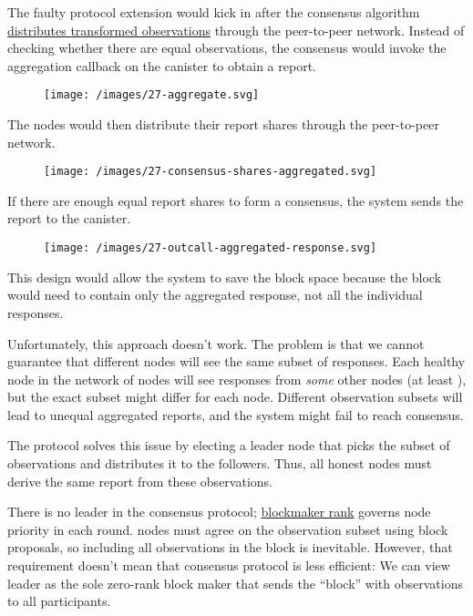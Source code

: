 \documentclass{article}
\begin{document}
The faulty protocol extension would kick in after the consensus algorithm \href{#fig-consensus-shares-transformed}{distributes transformed observations} through the peer-to-peer network.
Instead of checking whether there are  equal observations, the consensus would invoke the aggregation callback on the canister to obtain a report.

\begin{figure}[grayscale-diagram,p75]
\texttt{[image: /images/27-aggregate.svg]}
\end{figure}

The nodes would then distribute their report shares through the peer-to-peer network.

\begin{figure}[grayscale-diagram,p75]
\texttt{[image: /images/27-consensus-shares-aggregated.svg]}
\end{figure}

If there are enough equal report shares to form a consensus, the system sends the report to the canister.

\begin{figure}[grayscale-diagram,p75]
\texttt{[image: /images/27-outcall-aggregated-response.svg]}
\end{figure}

This design would allow the system to save the block space because the block would need to contain only the aggregated response, not all the individual responses.

Unfortunately, this approach doesn't work.
The problem is that we cannot guarantee that different nodes will see the same subset of responses.
Each healthy node in the network of  nodes will see responses from \emph{some} other nodes (at least ), but the exact subset might differ for each node.
Different observation subsets will lead to unequal aggregated reports, and the system might fail to reach consensus.

The  protocol solves this issue by electing a leader node that picks the subset of observations and distributes it to the followers.
Thus, all honest nodes must derive the same report from these observations.

There is no leader in the  consensus protocol; \href{https://internetcomputer.org/how-it-works/consensus/#block-making}{blockmaker rank} governs node priority in each round.
 nodes must agree on the observation subset using block proposals, so including all observations in the block is inevitable.
However, that requirement doesn't mean that  consensus protocol is less efficient: We can view  leader as the sole zero-rank block maker that sends the ``block'' with observations to all participants.
\end{document}
